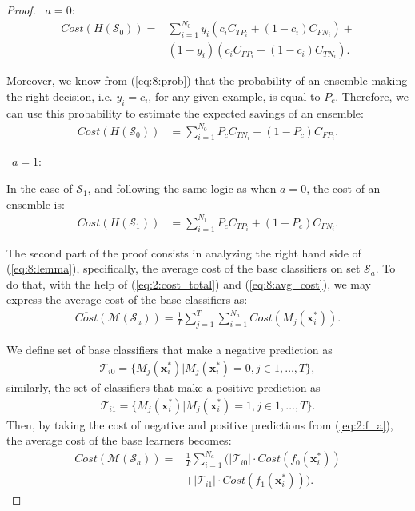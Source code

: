 {\begin{proof}
  \textbullet\ $a=0:$
  \begin{align}
  Cost(H(\mathcal{S}_0)) =& \sum_{i=1}^{N_0} y_i(c_i C_{TP_i} + (1-c_i)C_{FN_i})+ \nonumber \\  
    & (1-y_i)(c_i C_{FP_i} + (1-c_i)C_{TN_i}) . 
  \end{align}
  
  \noindent Moreover, we know from (\ref{eq:8:prob}) that the probability of an ensemble 
  making the right decision, i.e. $y_i=c_i$, for any given  example, is equal to $P_c$. 
  Therefore, we can use this probability to estimate the expected savings of an ensemble: 
  \begin{align}
    Cost(H(\mathcal{S}_0)) &= \sum_{i=1}^{N_0} P_c C_{TN_i} +(1-P_c)C_{FP_i}.
  \end{align}
  
  \textbullet\ $a=1:$
  
  \noindent In the case of $\mathcal{S}_1$, and following the same logic as when $a=0$, the cost of 
  an  ensemble is:
  \begin{align}
    Cost(H(\mathcal{S}_1)) &= \sum_{i=1}^{N_1} P_c C_{TP_i} + (1-P_c)C_{FN_i}.  
  \end{align}

  \noindent The second part of the proof consists in analyzing the right hand side of 
  (\ref{eq:8:lemma}),   specifically, the average cost of the base classifiers on set 
  $\mathcal{S}_a$. To do that, with the help of (\ref{eq:2:cost_total}) and (\ref{eq:8:avg_cost}), 
  we may express the average cost of the base classifiers as:
  \begin{align}
    \overline{Cost} (\mathcal{M}(\mathcal{S}_a)) = \frac{1}{T} \sum_{j=1}^{T} \sum_{i=1}^{N_a} 
    Cost(M_j(\mathbf{x}_i^*)).  
  \end{align} 
  
  \noindent We define set of base classifiers that make a negative prediction as
  \begin{align}
    \mathcal{T}_{i0}=\{M_j(\mathbf{x}_i^*) \vert M_j(\mathbf{x}_i^*) = 0, j \in 1,\dots,T\},
  \end{align}
  similarly, the set of classifiers that make a positive prediction as
  \begin{align}
    \mathcal{T}_{i1}=\{M_j(\mathbf{x}_i^*) \vert M_j(\mathbf{x}_i^*) = 1, j \in 1,\dots,T\}.
  \end{align}
  Then, by taking the cost of negative and positive predictions from (\ref{eq:2:f_a}), the 
  average cost of the base learners becomes:
  \begin{align}
    \overline{Cost} (\mathcal{M}(\mathcal{S}_a)) =& 
    \frac{1}{T} \sum_{i=1}^{N_a} \bigg( \vert \mathcal{T}_{i0} \vert \cdot 
    Cost(f_0(\mathbf{x}_i^*)) \nonumber \\
    & + \vert \mathcal{T}_{i1} \vert \cdot Cost(f_1(\mathbf{x}_i^*)) \bigg).
  \end{align} 


\end{proof}}

